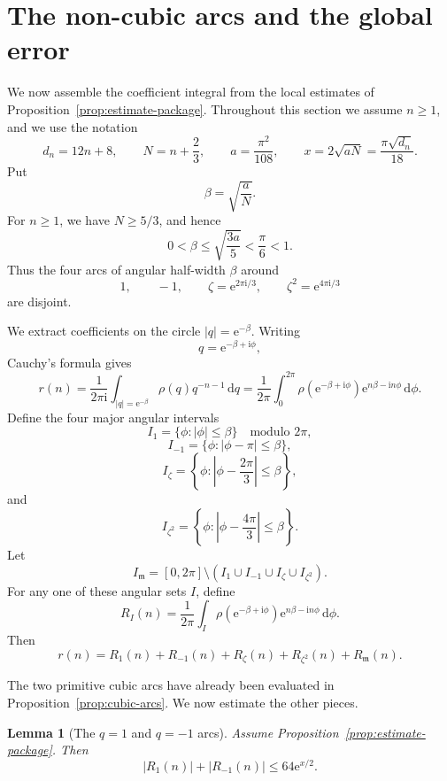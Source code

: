 \documentclass[11pt]{article}
\newtheorem{lemma}[theorem]{Lemma}
\theoremstyle{remark}
\newcommand{\ii}{\mathrm i}
\newcommand{\e}{\mathrm e}
\newcommand{\dd}{\mathrm d}
\newcommand{\mm}{\mathfrak m}
\begin{document}
\section{The non-cubic arcs and the global error}\label{sec:remaining-arcs}

We now assemble the coefficient integral from the local estimates of
Proposition~\ref{prop:estimate-package}.  Throughout this section we assume
$n\geq 1$, and we use the notation
\[
d_n=12n+8,\qquad
N=n+\frac23,\qquad
a=\frac{\pi^2}{108},
\qquad
x=2\sqrt{aN}=\frac{\pi\sqrt{d_n}}{18}.
\]
Put
\[
\beta=\sqrt{\frac{a}{N}}.
\]
For $n\geq1$, we have $N\geq5/3$, and hence
\[
0<\beta\leq\sqrt{\frac{3a}{5}}<\frac{\pi}{6}<1.
\]
Thus the four arcs of angular half-width $\beta$ around
\[
1,\qquad -1,\qquad \zeta=\e^{2\pi\ii/3},
\qquad \zeta^2=\e^{4\pi\ii/3}
\]
are disjoint.

We extract coefficients on the circle $|q|=\e^{-\beta}$.  Writing
\[
q=\e^{-\beta+\ii\phi},
\]
Cauchy's formula gives
\[
r(n)=\frac1{2\pi\ii}\int_{|q|=\e^{-\beta}}\rho(q)q^{-n-1}\,\dd q
=
\frac1{2\pi}\int_{0}^{2\pi}
\rho(\e^{-\beta+\ii\phi})\e^{n\beta-\ii n\phi}\,\dd\phi.
\]
Define the four major angular intervals
\[
I_1=\{\phi:|\phi|\leq\beta\}\quad \text{modulo }2\pi,
\]
\[
I_{-1}=\{\phi:|\phi-\pi|\leq\beta\},
\]
\[
I_\zeta=\left\{\phi:\left|\phi-\frac{2\pi}{3}\right|\leq\beta\right\},
\]
and
\[
I_{\zeta^2}=\left\{\phi:\left|\phi-\frac{4\pi}{3}\right|\leq\beta\right\}.
\]
Let
\[
I_{\mm}
=
[0,2\pi]\setminus
\left(I_1\cup I_{-1}\cup I_\zeta\cup I_{\zeta^2}\right).
\]
For any one of these angular sets $I$, define
\[
R_I(n)
=
\frac1{2\pi}
\int_I
\rho(\e^{-\beta+\ii\phi})\e^{n\beta-\ii n\phi}\,\dd\phi.
\]
Then
\begin{equation}\label{eq:arc-decomposition}
r(n)
=
R_1(n)+R_{-1}(n)+R_\zeta(n)+R_{\zeta^2}(n)+R_{\mm}(n).
\end{equation}

The two primitive cubic arcs have already been evaluated in
Proposition~\ref{prop:cubic-arcs}.  We now estimate the other pieces.

\begin{lemma}[The $q=1$ and $q=-1$ arcs]\label{lem:one-minusone-arcs}
Assume Proposition~\ref{prop:estimate-package}.  Then
\begin{equation}\label{eq:one-minusone-bound}
|R_1(n)|+|R_{-1}(n)|\leq64\e^{x/2}.
\end{equation}
\end{lemma}
\end{document}

